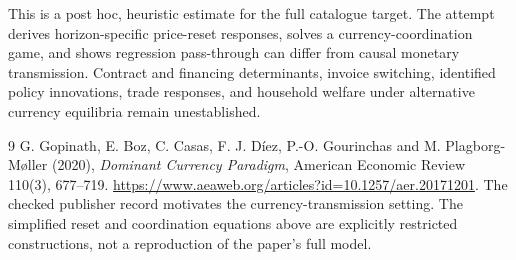 \documentclass[11pt,a4paper]{article}
\begin{document}
This is a post hoc, heuristic estimate for the full catalogue target.
The attempt derives horizon-specific price-reset responses, solves a currency-coordination game, and shows regression pass-through can differ from causal monetary transmission. Contract and financing determinants, invoice switching, identified policy innovations, trade responses, and household welfare under alternative currency equilibria remain unestablished.

\begin{thebibliography}{9}
 G. Gopinath, E. Boz, C. Casas, F. J. D\'iez, P.-O. Gourinchas and M. Plagborg-M\o ller (2020), \emph{Dominant Currency Paradigm}, American Economic Review 110(3), 677--719. \url{https://www.aeaweb.org/articles?id=10.1257/aer.20171201}. The checked publisher record motivates the currency-transmission setting. The simplified reset and coordination equations above are explicitly restricted constructions, not a reproduction of the paper's full model.
\end{thebibliography}
\end{document}
